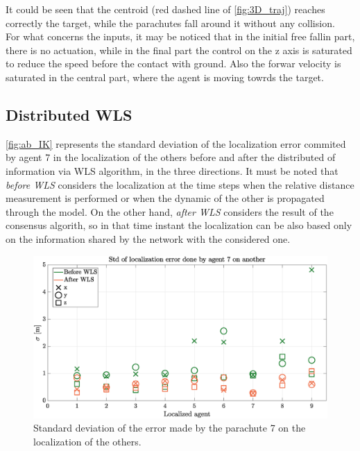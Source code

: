It could be seen that the centroid (red dashed line of \autoref{fig:3D_traj}) reaches correctly the target, while the parachutes fall around it without any collision.\\
For what concerns the inputs, it may be noticed that in the initial free fallin part, there is no actuation, while in the final part the control on the z axis is saturated to reduce the speed before the contact with ground. Also the forwar velocity is saturated in the central part, where the agent is moving towrds the target. 

\subsection{Distributed WLS}
\autoref{fig:ab_IK} represents the standard deviation of the localization error commited by agent 7 in the localization of the others before and after the distributed of information via WLS algorithm, in the three directions. It must be noted that \textit{before WLS} considers the localization at the time steps when the relative distance measurement is performed or when the dynamic of the other is propagated through the model. On the other hand, \textit{after WLS} considers the result of the consensus algorith, so in that time instant the localization can be also based only on the information shared by the network with the considered one.
\begin{figure}[h]
    \centering
    \includegraphics[width=\columnwidth]{images/mdl2_9chutes_be_wls.eps}
    \caption{Standard deviation of the error made by the parachute 7 on the localization of the others.}
    \label{fig:ab_IK}
\end{figure}


